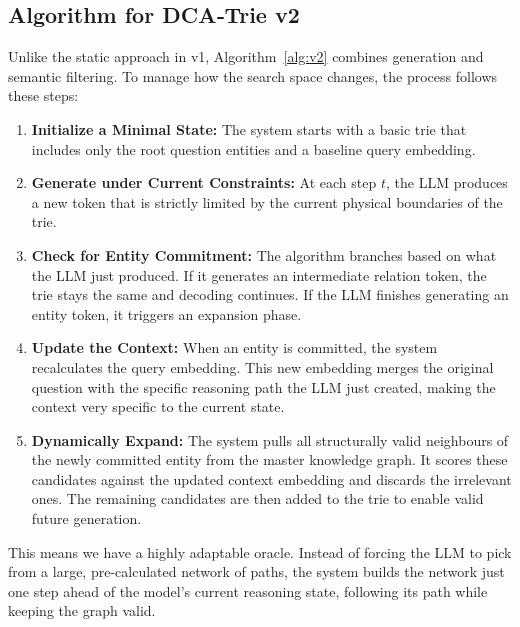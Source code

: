 \newpage

\subsection{Algorithm for DCA‑Trie v2}

Unlike the static approach in v1, Algorithm~\ref{alg:v2} combines generation and semantic filtering. To manage how the search space changes, the process follows these steps:

\begin{enumerate}
  \item \textbf{Initialize a Minimal State:} The system starts with a basic trie that includes only the root question entities and a baseline query embedding.
  \item \textbf{Generate under Current Constraints:} At each step $t$, the LLM produces a new token that is strictly limited by the current physical boundaries of the trie.
  \item \textbf{Check for Entity Commitment:} The algorithm branches based on what the LLM just produced. If it generates an intermediate relation token, the trie stays the same and decoding continues. If the LLM finishes generating an entity token, it triggers an expansion phase.
  \item \textbf{Update the Context:} When an entity is committed, the system recalculates the query embedding. This new embedding merges the original question with the specific reasoning path the LLM just created, making the context very specific to the current state.
  \item \textbf{Dynamically Expand:} The system pulls all structurally valid neighbours of the newly committed entity from the master knowledge graph. It scores these candidates against the updated context embedding and discards the irrelevant ones. The remaining candidates are then added to the trie to enable valid future generation.
\end{enumerate}

This means we have a highly adaptable oracle. Instead of forcing the LLM to pick from a large, pre-calculated network of paths, the system builds the network just one step ahead of the model's current reasoning state, following its path while keeping the graph valid.


